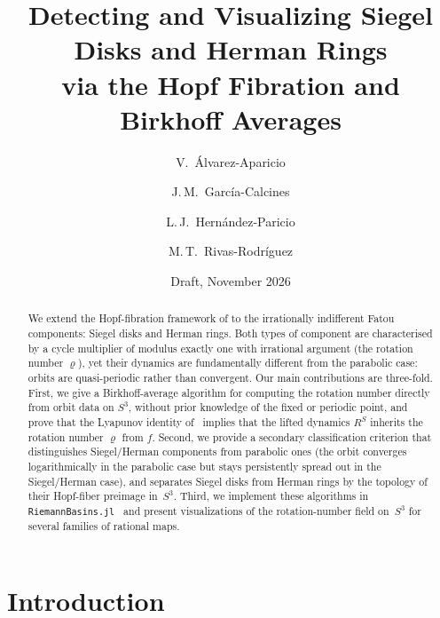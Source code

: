 \documentclass[12pt,a4paper]{article}
\newcommand{\Sthree}{S^3}
\newcommand{\RS}{R^S}         %
\newcommand{\rot}{\varrho}    %
\begin{document}
\title{Detecting and Visualizing Siegel Disks and Herman Rings\\
       via the Hopf Fibration and Birkhoff Averages}

\author{V.\ \'Alvarez-Aparicio \and
        J.\,M.\ Garc\'ia-Calcines \and
        L.\,J.\ Hern\'andez-Paricio \and
        M.\,T.\ Rivas-Rodr\'iguez}

\date{Draft, November 2026}

\maketitle

\begin{abstract}
We extend the Hopf-fibration framework of \cite{Alvarez2023,FatouHopf2026}
to the irrationally indifferent Fatou components: Siegel disks and Herman
rings.
%
Both types of component are characterised by a cycle multiplier of modulus
exactly one with irrational argument (the rotation number $\rot$), yet their
dynamics are fundamentally different from the parabolic case: orbits are
quasi-periodic rather than convergent.
%
Our main contributions are three-fold.
First, we give a Birkhoff-average algorithm for computing the rotation number
directly from orbit data on $S^3$, without prior knowledge of the fixed or
periodic point, and prove that the Lyapunov identity of~\cite{FatouHopf2026}
implies that the lifted dynamics $\RS$ inherits the rotation number $\rot$
from $f$.
Second, we provide a secondary classification criterion that distinguishes
Siegel/Herman components from parabolic ones (the orbit converges
logarithmically in the parabolic case but stays persistently spread out in
the Siegel/Herman case), and separates Siegel disks from Herman rings by
the topology of their Hopf-fiber preimage in~$\Sthree$.
Third, we implement these algorithms in \texttt{RiemannBasins.jl}\ \cite{RiemannBasins}
and present visualizations of the rotation-number field on~$\Sthree$ for
several families of rational maps.
\end{abstract}

\tableofcontents

\section{Introduction}
\label{sec:intro}
\end{document}
